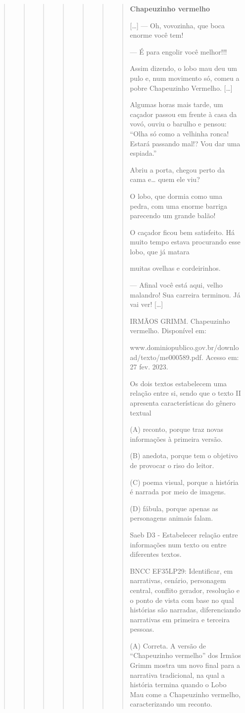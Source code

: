 \begin{quote}
\begin{quote}
\begin{quote}
\begin{quote}
\begin{quote}
\begin{quote}
\begin{quote}
\textbf{Chapeuzinho vermelho}

{[}\ldots{}{]} --- Oh, vovozinha, que boca enorme você tem!

--- É para engolir você melhor!!!

Assim dizendo, o lobo mau deu um pulo e, num movimento só, comeu a pobre
Chapeuzinho Vermelho. {[}\ldots{}{]}

Algumas horas mais tarde, um caçador passou em frente à casa da vovó,
ouviu o barulho e pensou: ``Olha só como a velhinha ronca! Estará
passando mal!? Vou dar uma espiada.''

Abriu a porta, chegou perto da cama e\ldots{} quem ele viu?

O lobo, que dormia como uma pedra, com uma enorme barriga parecendo um
grande balão!

O caçador ficou bem satisfeito. Há muito tempo estava procurando esse
lobo, que já matara

muitas ovelhas e cordeirinhos.

--- Afinal você está aqui, velho malandro! Sua carreira terminou. Já vai
ver! {[}\ldots{}{]}

IRMÃOS GRIMM. Chapeuzinho vermelho. Disponível em:

www.dominiopublico.gov.br/download/texto/me000589.pdf. Acesso em: 27
fev. 2023.

Os dois textos estabelecem uma relação entre si, sendo que o texto II
apresenta características do gênero textual

(A) reconto, porque traz novas informações à primeira versão.

(B) anedota, porque tem o objetivo de provocar o riso do leitor.

(C) poema visual, porque a história é narrada por meio de imagens.

(D) fábula, porque apenas as personagens animais falam.

Saeb D3 - Estabelecer relação entre informações num texto ou entre
diferentes textos.

BNCC EF35LP29: Identificar, em narrativas, cenário, personagem central,
conflito gerador, resolução e o ponto de vista com base no qual
histórias são narradas, diferenciando narrativas em primeira e terceira
pessoas.

(A) Correta. A versão de ``Chapeuzinho vermelho'' dos Irmãos Grimm
mostra um novo final para a narrativa tradicional, na qual a história
termina quando o Lobo Mau come a Chapeuzinho vermelho, caracterizando um
reconto.


\end{quote}
\end{quote}
\end{quote}
\end{quote}
\end{quote}
\end{quote}
\end{quote}
